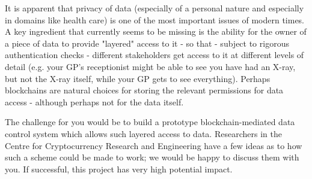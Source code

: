 \abstract

It is apparent that privacy of data (especially of a personal nature and especially in domains like health care) is one of the most important issues of modern times. A key ingredient that currently seems to be missing is the ability for the owner of a piece of data to provide "layered" access to it - so that - subject to rigorous authentication checks - different stakeholders get access to it at different levels of detail (e.g. your GP's receptionist might be able to see you have had an X-ray, but not the X-ray itself, while your GP gets to see everything). Perhaps blockchains are natural choices for storing the relevant permissions for data access - although perhaps not for the data itself.

The challenge for you would be to build a prototype blockchain-mediated data control system which allows such layered access to data. Researchers in the Centre for Cryptocurrency Research and Engineering have a few ideas as to how such a scheme could be made to work; we would be happy to discuss them with you. If successful, this project has very high potential impact.
